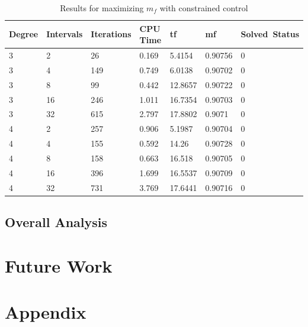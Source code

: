 \documentclass[]{article}
\begin{document}
\begin{table}
	\begin{tabular}{lllllll}
		Degree & Intervals & Iterations & CPU Time & tf & mf & Solved\ Status \\ 
		\hline 
		3 & 2 & 26 & 0.169 & 5.4154 & 0.90756 & 0 \\ 
		3 & 4 & 149 & 0.749 & 6.0138 & 0.90702 & 0 \\ 
		3 & 8 & 99 & 0.442 & 12.8657 & 0.90722 & 0 \\ 
		3 & 16 & 246 & 1.011 & 16.7354 & 0.90703 & 0 \\ 
		3 & 32 & 615 & 2.797 & 17.8802 & 0.9071 & 0 \\ 
		4 & 2 & 257 & 0.906 & 5.1987 & 0.90704 & 0 \\ 
		4 & 4 & 155 & 0.592 & 14.26 & 0.90728 & 0 \\ 
		4 & 8 & 158 & 0.663 & 16.518 & 0.90705 & 0 \\ 
		4 & 16 & 396 & 1.699 & 16.5537 & 0.90709 & 0 \\ 
		4 & 32 & 731 & 3.769 & 17.6441 & 0.90716 & 0 \\ 
		\hline 
	\end{tabular}
	\caption{Results for maximizing \(m_f\) with constrained control}
	\label{table:4}
\end{table}
\FloatBarrier

	\subsection{Overall Analysis}
	
	\section{Future Work}

	
	\section{Appendix}
	
	
	
	
	
	
    
\end{document}
